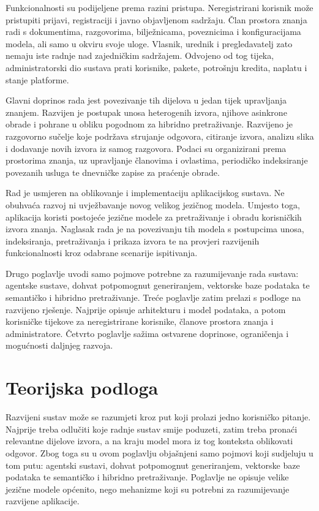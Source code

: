 Funkcionalnosti su podijeljene prema razini pristupa. Neregistrirani korisnik može pristupiti prijavi, registraciji i javno objavljenom sadržaju. Član prostora znanja radi s dokumentima, razgovorima, bilježnicama, poveznicima i konfiguracijama modela, ali samo u okviru svoje uloge. Vlasnik, urednik i pregledavatelj zato nemaju iste radnje nad zajedničkim sadržajem. Odvojeno od tog tijeka, administratorski dio sustava prati korisnike, pakete, potrošnju kredita, naplatu i stanje platforme.

Glavni doprinos rada jest povezivanje tih dijelova u jedan tijek upravljanja znanjem. Razvijen je postupak unosa heterogenih izvora, njihove asinkrone obrade i pohrane u obliku pogodnom za hibridno pretraživanje. Razvijeno je razgovorno sučelje koje podržava strujanje odgovora, citiranje izvora, analizu slika i dodavanje novih izvora iz samog razgovora. Podaci su organizirani prema prostorima znanja, uz upravljanje članovima i ovlastima, periodičko indeksiranje povezanih usluga te dnevničke zapise za praćenje obrade.

Rad je usmjeren na oblikovanje i implementaciju aplikacijskog sustava. Ne obuhvaća razvoj ni uvježbavanje novog velikog jezičnog modela. Umjesto toga, aplikacija koristi postojeće jezične modele za pretraživanje i obradu korisničkih izvora znanja. Naglasak rada je na povezivanju tih modela s postupcima unosa, indeksiranja, pretraživanja i prikaza izvora te na provjeri razvijenih funkcionalnosti kroz odabrane scenarije ispitivanja.

Drugo poglavlje uvodi samo pojmove potrebne za razumijevanje rada sustava: agentske sustave, dohvat potpomognut generiranjem, vektorske baze podataka te semantičko i hibridno pretraživanje. Treće poglavlje zatim prelazi s podloge na razvijeno rješenje. Najprije opisuje arhitekturu i model podataka, a potom korisničke tijekove za neregistrirane korisnike, članove prostora znanja i administratore. Četvrto poglavlje sažima ostvarene doprinose, ograničenja i mogućnosti daljnjeg razvoja.

\chapter{Teorijska podloga}

Razvijeni sustav može se razumjeti kroz put koji prolazi jedno korisničko pitanje. Najprije treba odlučiti koje radnje sustav smije poduzeti, zatim treba pronaći relevantne dijelove izvora, a na kraju model mora iz tog konteksta oblikovati odgovor. Zbog toga su u ovom poglavlju objašnjeni samo pojmovi koji sudjeluju u tom putu: agentski sustavi, dohvat potpomognut generiranjem, vektorske baze podataka te semantičko i hibridno pretraživanje. Poglavlje ne opisuje velike jezične modele općenito, nego mehanizme koji su potrebni za razumijevanje razvijene aplikacije.

